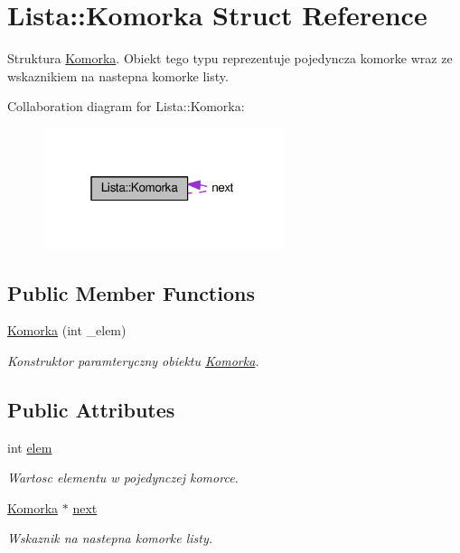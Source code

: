 \hypertarget{struct_lista_1_1_komorka}{}\section{Lista\+:\+:Komorka Struct Reference}
\label{struct_lista_1_1_komorka}


Struktura \hyperlink{struct_lista_1_1_komorka}{Komorka}. Obiekt tego typu reprezentuje pojedyncza komorke wraz ze wskaznikiem na nastepna komorke listy.  




Collaboration diagram for Lista\+:\+:Komorka\+:\nopagebreak
\begin{figure}[H]
\begin{center}
\leavevmode
\includegraphics[width=199pt]{struct_lista_1_1_komorka__coll__graph}
\end{center}
\end{figure}
\subsection*{Public Member Functions}
\begin{DoxyCompactItemize}
\item 
\hyperlink{struct_lista_1_1_komorka_a1843c3c4ae9752cea90cfa21076f3e9c}{Komorka} (int \+\_\+elem)
\begin{DoxyCompactList}\small\item\em Konstruktor paramteryczny obiektu \hyperlink{struct_lista_1_1_komorka}{Komorka}. \end{DoxyCompactList}\end{DoxyCompactItemize}
\subsection*{Public Attributes}
\begin{DoxyCompactItemize}
\item 
int \hyperlink{struct_lista_1_1_komorka_aeb683e1dce8a8c096cc54a6645137411}{elem}
\begin{DoxyCompactList}\small\item\em Wartosc elementu w pojedynczej komorce. \end{DoxyCompactList}\item 
\hyperlink{struct_lista_1_1_komorka}{Komorka} $\ast$ \hyperlink{struct_lista_1_1_komorka_aa04e9d2ed0260f2adbff6855f7bcd77e}{next}
\begin{DoxyCompactList}\small\item\em Wskaznik na nastepna komorke listy. \end{DoxyCompactList}\end{DoxyCompactItemize}


